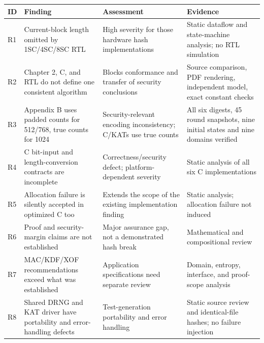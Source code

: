 \documentclass[
  english,
  11pt,
  a4paper,
]{article}
\newcounter{none} %
\begin{document}
{\def\LTcaptype{none} %
\begin{longtable}[]{@{}
  >{\raggedright\arraybackslash}p{}
  >{\raggedright\arraybackslash}p{}
  >{\raggedright\arraybackslash}p{}
  >{\raggedright\arraybackslash}p{}@{}}
\toprule\noalign{}
\begin{minipage}[b]{\linewidth}\raggedright
ID
\end{minipage} & \begin{minipage}[b]{\linewidth}\raggedright
Finding
\end{minipage} & \begin{minipage}[b]{\linewidth}\raggedright
Assessment
\end{minipage} & \begin{minipage}[b]{\linewidth}\raggedright
Evidence
\end{minipage} \\
\midrule\noalign{}
\endhead
\bottomrule\noalign{}
\endlastfoot
R1 & Current-block length omitted by 1SC/4SC/8SC RTL & High severity for
those hardware hash implementations & Static dataflow and state-machine
analysis; no RTL simulation \\
R2 & Chapter 2, C, and RTL do not define one consistent algorithm &
Blocks conformance and transfer of security conclusions & Source
comparison, PDF rendering, independent model, exact constant checks \\
R3 & Appendix B uses padded counts for 512/768, true counts for 1024 &
Security-relevant encoding inconsistency; C/KATs use true counts & All
six digests, 45 round snapshots, nine initial states and nine domains
verified \\
R4 & C bit-input and length-conversion contracts are incomplete &
Correctness/security defect; platform-dependent severity & Static
analysis of all six C implementations \\
R5 & Allocation failure is silently accepted in optimized C too &
Extends the scope of the existing implementation finding & Static
analysis; allocation failure not induced \\
R6 & Proof and security-margin claims are not established & Major
assurance gap, not a demonstrated hash break & Mathematical and
compositional review \\
R7 & MAC/KDF/XOF recommendations exceed what was established &
Application specifications need separate review & Domain, entropy,
interface, and proof-scope analysis \\
R8 & Shared DRNG and KAT driver have portability and error-handling
defects & Test-generation portability and error handling & Static source
review and identical-file hashes; no failure injection \\
\end{longtable}
}
\end{document}
